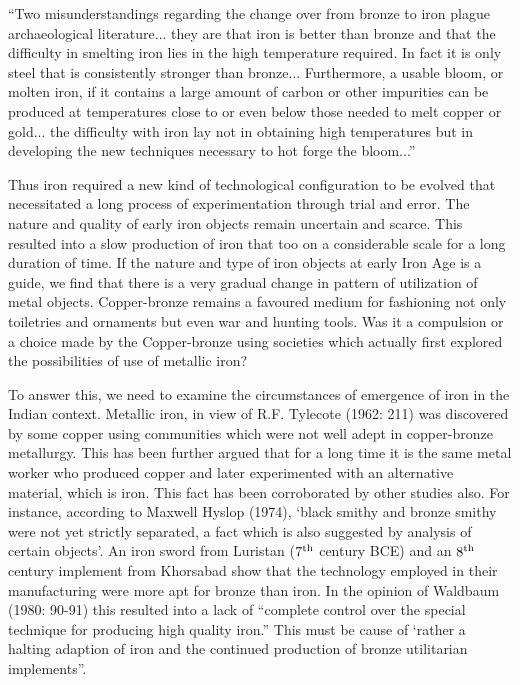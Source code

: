 {\footnotesize “Two misunderstandings regarding the change over from bronze to iron plague archaeological literature... they are that iron is better than bronze and that the difficulty in smelting iron lies in the high temperature required. In fact it is only steel that is consistently stronger than bronze... Furthermore, a usable bloom, or molten iron, if it contains a large amount of carbon or other impurities can be produced at temperatures close to or even below those needed to melt copper or gold... the difficulty with iron lay not in obtaining high temperatures but in developing the new techniques necessary to hot forge the bloom...” }

Thus iron required a new kind of technological configuration to be evolved that necessitated a long process of experimentation through trial and error. The nature and quality of early iron objects remain uncertain and scarce. This resulted into a slow production of iron that too on a considerable scale for a long duration of time. If the nature and type of iron objects at early Iron Age is a guide, we find that there is a very gradual change in pattern of utilization of metal objects. Copper-bronze remains a favoured medium for fashioning not only toiletries and ornaments but even war and hunting tools. Was it a compulsion or a choice made by the Copper-bronze using societies which actually first explored the possibilities of use of metallic iron?

To answer this, we need to examine the circumstances of emergence of iron in the Indian context. Metallic iron, in view of R.F. Tylecote (1962: 211) was discovered by some copper using communities which were not well adept in copper-bronze metallurgy. This has been further argued that for a long time it is the same metal worker who produced copper and later experimented with an alternative material, which is iron. This fact has been corroborated by other studies also. For instance, according to Maxwell Hyslop (1974), ‘black smithy and bronze smithy were not yet strictly separated, a fact which is also suggested by analysis of certain objects’. An iron sword from Luristan ($7^{\rm th}$ century BCE) and an $8^{\rm th}$ century implement from Khorsabad show that the technology employed in their manufacturing were more apt for bronze than iron. In the opinion of Waldbaum (1980: 90-91) this resulted into a lack of “complete control over the special technique for producing high quality iron.” This must be cause of ‘rather a halting adaption of iron and the continued production of bronze utilitarian implements”.

